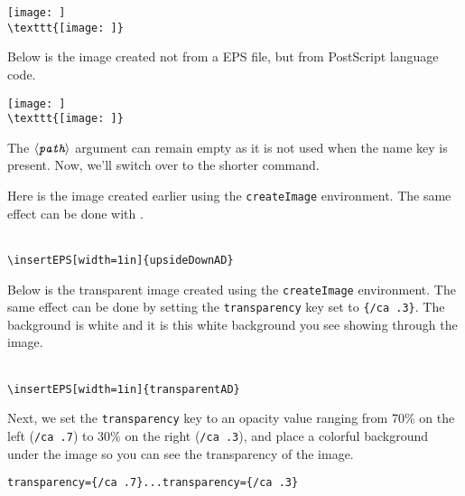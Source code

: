 \documentclass{article}
\def\anglemeta#1{$\langle\textit{\texttt{#1}}\rangle$}
\def\meta#1{\textit{\texttt{#1}}}
\let\meta\anglemeta
\begin{document}

\begin{center}
\texttt{[image: ]}\\
\small\verb!\texttt{[image: ]}!
\end{center}

Below is the image created not from a EPS file, but from PostScript language code.

\begin{center}
\texttt{[image: ]}\\
\small\verb!\texttt{[image: ]}!
\end{center}

The \meta{path} argument can remain empty as it is not used when the name key is
present. Now, we'll switch over to the shorter  command.

Here is the image created earlier using the \texttt{createImage} environment. The same effect
can be done with .

\begin{center}
\\
\verb!\insertEPS[width=1in]{upsideDownAD}!
\end{center}

Below is the transparent image created using the \texttt{createImage} environment. The same effect
can be done by setting the \texttt{transparency} key set to \verb!{/ca .3}!. The background is white
and it is this white background you see showing through the image.

\begin{center}
\\
\verb!\insertEPS[width=1in]{transparentAD}!
\end{center}

Next, we set the \texttt{transparency} key to an opacity value ranging from 70\% on the left (\texttt{/ca .7})
to 30\% on the right (\texttt{/ca .3}), and place a colorful background under the
image so you can see the transparency of the image.

\begin{center}\previewfalse
{} %
\small\verb!transparency={/ca .7}...transparency={/ca .3}!
\end{center}
\end{document}
